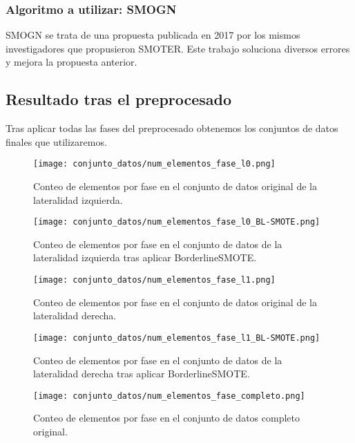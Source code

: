 \subsubsection{Algoritmo a utilizar: SMOGN}

SMOGN \cite{SMOGN} se trata de una propuesta publicada en 2017 por los mismos investigadores que propusieron SMOTER. Este trabajo soluciona diversos errores y mejora la propuesta anterior. 


\newpage

\subsection{Resultado tras el preprocesado}

Tras aplicar todas las fases del preprocesado obtenemos los conjuntos de datos finales que utilizaremos.

\begin{figure}[H]
    \centering
	  \texttt{[image: conjunto\_datos/num\_elementos\_fase\_l0.png]}
    \caption{Conteo de elementos por fase en el conjunto de datos original de la lateralidad izquierda.}
	 \label{fig:l0-orig}
\end{figure}

\begin{figure}[H]
    \centering
     \texttt{[image: conjunto\_datos/num\_elementos\_fase\_l0\_BL-SMOTE.png]}
    \caption{Conteo de elementos por fase en el conjunto de datos de la lateralidad izquierda tras aplicar BorderlineSMOTE.}
	 \label{fig:l0-over}
\end{figure}

\begin{figure}[H]
    \centering
	  \texttt{[image: conjunto\_datos/num\_elementos\_fase\_l1.png]}
    \caption{Conteo de elementos por fase en el conjunto de datos original de la lateralidad derecha.}
	 \label{fig:l1-orig}
\end{figure}

\begin{figure}[H]
    \centering
     \texttt{[image: conjunto\_datos/num\_elementos\_fase\_l1\_BL-SMOTE.png]}
    \caption{Conteo de elementos por fase en el conjunto de datos de la lateralidad derecha tras aplicar BorderlineSMOTE.}
	 \label{fig:l1-over}
\end{figure}



\begin{figure}[H]
    \centering
	  \texttt{[image: conjunto\_datos/num\_elementos\_fase\_completo.png]}
     \label{fig:completo-orig}
    \caption{Conteo de elementos por fase en el conjunto de datos completo original.}

\end{figure}

